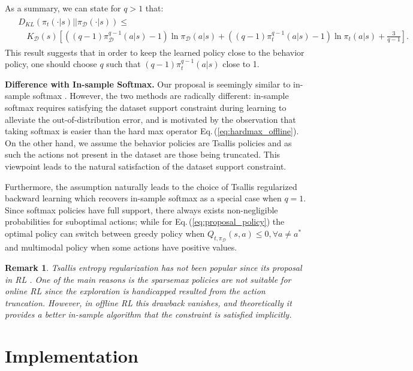 \documentclass{article}
\newtheorem*{remark}{Remark}
\newcommand{\AdaBracket}[1]{\left(#1\right)}
\newcommand{\AdaRectBracket}[1]{\left[#1\right]}
\newcommand{\KLany}[2]{D_{\!K\!L}\!\left(#1 \left|  \right| #2 \right)}
\newcommand{\eq}[1]{Eq.\,(#1)}
\newcommand{\datasetPolicy}{\pi_{\mathcal{D}}}
\begin{document}
As a summary, we can state for $q>1$ that:
\begin{align}
    \begin{split}
    &\KLany{\pi_t(\cdot|s)}{\datasetPolicy(\cdot|s)}  \leq  \\
    &\quad K_{\mathcal{D}}(s){\AdaRectBracket{\AdaBracket{ (q-1) \datasetPolicy^{q-1}(a|s) - 1}\ln\datasetPolicy(a|s) + \AdaBracket{  (q-1) \pi_{t}^{q-1}(a|s) - 1}\ln\pi_t(a|s) + \frac{3}{q-1}}}.
\end{split}
\end{align}
This result suggests that in order to keep the learned policy close to the behavior policy, one should choose $q$ such that $(q-1)\pi^{q-1}_t(a|s)$ close to 1.

\textbf{Difference with In-sample Softmax. }
Our proposal is seemingly similar to in-sample softmax \cite{Xiao2023-InSampleSoftmax}.
However, the two methods are radically different: in-sample softmax requires satisfying the dataset support constraint during learning to alleviate the out-of-distribution error, and is motivated by the observation that taking softmax is easier than the hard max operator \eq{\ref{eq:hardmax_offline}}.
On the other hand, we assume the behavior policies are Tsallis policies and as such the actions not present in the dataset are those being truncated.
This viewpoint leads to the natural satisfaction of the dataset support constraint.

Furthermore, the assumption naturally leads to the choice of Tsallis regularized backward learning which recovers in-sample softmax as a special case when $q=1$.
Since softmax policies have full support, there always exists non-negligible probabilities for suboptimal actions; while for \eq{\ref{eq:proposal_policy}} the optimal policy can switch between greedy policy when $Q_{t, \datasetPolicy}(s,a) \leq 0, \forall a\neq a^*$ and multimodal policy when some actions have positive values.

\begin{remark}
    Tsallis entropy regularization has not been popular since its proposal in RL \cite{Lee2018-TsallisRAL}.
    One of the main reasons is the sparsemax policies are not suitable for online RL since the exploration is handicapped resulted from the action truncation.
    However, in offline RL this drawback vanishes, and theoretically it provides a better in-sample algorithm that the constraint is satisfied implicitly. 
\end{remark}


\section{Implementation}
\end{document}
